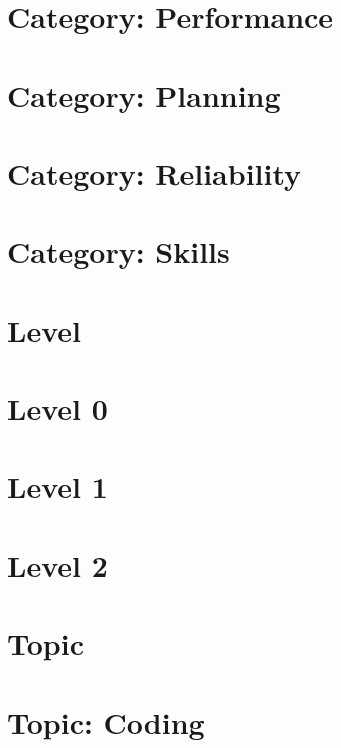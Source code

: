 \documentclass[twoside]{book}
\newcommand{\+}{\discretionary{\mbox{\scriptsize$\hookleftarrow$}}{}{}}
\begin{document}
\chapter{Category\+: Performance}
\label{md_markdown_category_performance}

\chapter{Category\+: Planning}
\label{md_markdown_category_planning}

\chapter{Category\+: Reliability}
\label{md_markdown_category_reliability}

\chapter{Category\+: Skills}
\label{md_markdown_category_skills}

\chapter{Level}
\label{md_markdown_level}

\chapter{Level 0}
\label{md_markdown_level0}

\chapter{Level 1}
\label{md_markdown_level1}

\chapter{Level 2}
\label{md_markdown_level2}

\chapter{Topic}
\label{md_markdown_topic}

\chapter{Topic\+: Coding}
\label{md_markdown_topic_coding}

\end{document}
